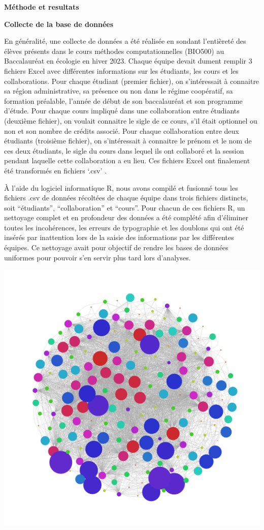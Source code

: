 \documentclass[
]{article}
\begin{document}
\textbf{Méthode et resultats}

\textbf{Collecte de la base de données}

En généralité, une collecte de données a été réalisée en sondant
l'entièreté des élèves présents dans le cours méthodes computationnelles
(BIO500) au Baccalauréat en écologie en hiver 2023. Chaque équipe devait
dument remplir 3 fichiers Excel avec différentes informations sur les
étudiants, les cours et les collaborations. Pour chaque étudiant
(premier fichier), on s'intéressait à connaitre sa région
administrative, sa présence ou non dans le régime coopératif, sa
formation préalable, l'année de début de son baccalauréat et son
programme d'étude. Pour chaque cours impliqué dans une collaboration
entre étudiants (deuxième fichier), on voulait connaitre le sigle de ce
cours, s'il était optionnel ou non et son nombre de crédits associé.
Pour chaque collaboration entre deux étudiants (troisième fichier), on
s'intéressait à connaitre le prénom et le nom de ces deux étudiants, le
sigle du cours dans lequel ils ont collaboré et la session pendant
laquelle cette collaboration a eu lieu. Ces fichiers Excel ont
finalement été transformés en fichiers `.csv' .

À l'aide du logiciel informatique R, nous avons compilé et fusionné tous
les fichiers .csv de données récoltées de chaque équipe dans trois
fichiers distincts, soit ``étudiants'', ``collaboration'' et ``cours''.
Pour chacun de ces fichiers R, un nettoyage complet et en profondeur des
données a été complété afin d'éliminer toutes les incohérences, les
erreurs de typographie et les doublons qui ont été insérés par
inattention lors de la saisie des informations par les différentes
équipes. Ce nettoyage avait pour objectif de rendre les bases de données
uniformes pour pouvoir s'en servir plus tard lors d'analyses.

\includegraphics{images/Reseau_de_collaboration.png}
\end{document}
